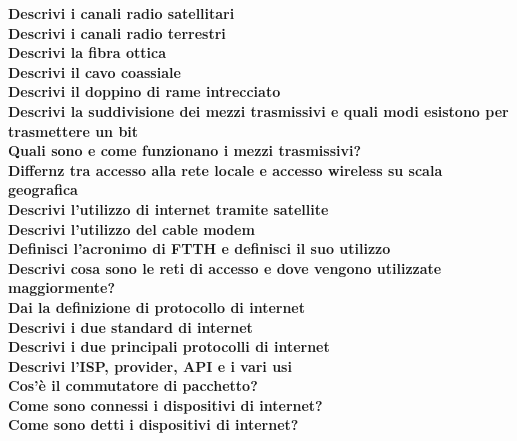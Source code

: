 \documentclass[11pt, oneside]{article}   	%
\begin{document}
\textbf{Descrivi i canali radio satellitari}\\

\textbf{Descrivi i canali radio terrestri}\\

\textbf{Descrivi la fibra ottica}\\

\textbf{Descrivi il cavo coassiale}\\

\textbf{Descrivi il doppino di rame intrecciato}\\

\textbf{Descrivi la suddivisione dei mezzi trasmissivi e quali modi esistono per trasmettere un bit}\\

\textbf{Quali sono e come funzionano i mezzi trasmissivi?}\\

\textbf{Differnz tra accesso alla rete locale e accesso wireless su scala geografica}\\

\textbf{Descrivi l'utilizzo di internet tramite satellite}\\

\textbf{Descrivi l’utilizzo del cable modem}\\

\textbf{Definisci l’acronimo di FTTH e definisci il suo utilizzo}\\

\textbf{Descrivi cosa sono le reti di accesso e dove vengono utilizzate maggiormente?}\\

\textbf{Dai la definizione di protocollo di internet}\\

\textbf{Descrivi i due standard di internet}\\

\textbf{Descrivi i due principali protocolli di internet}\\

\textbf{Descrivi l'ISP, provider, API e i vari usi}\\

\textbf{Cos'è il commutatore di pacchetto?}\\

\textbf{Come sono connessi i dispositivi di internet?}\\

\textbf{Come sono detti i dispositivi di internet?}\\
\end{document}
